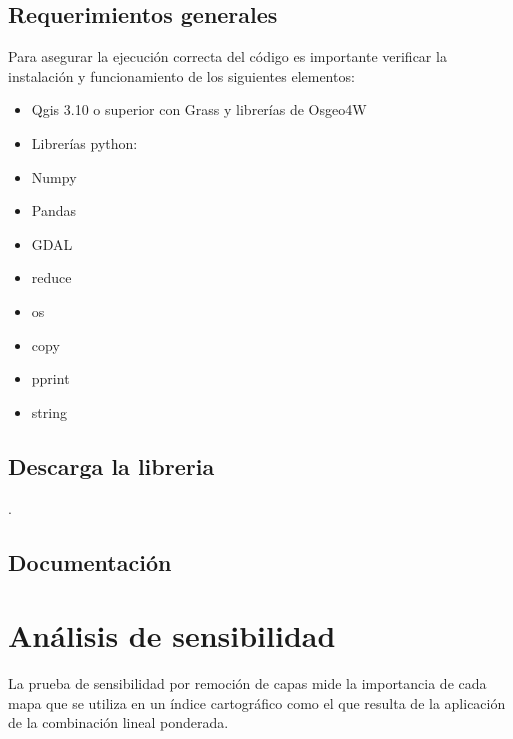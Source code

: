 \documentclass[letterpaper,10pt,spanish]{sphinxmanual}
\begin{document}
\subsection{Requerimientos generales}
\label{\detokenize{apcsig:requerimientos-generales}}
Para asegurar la ejecución correcta del código es importante
verificar la instalación y funcionamiento de los siguientes elementos:
\begin{itemize}
\item {} 
Qgis 3.10 o superior con Grass y librerías de Osgeo4W

\item {} 
Librerías python:

\end{itemize}
\begin{itemize}
\item {} 
Numpy

\item {} 
Pandas

\item {} 
GDAL

\item {} 
reduce

\item {} 
os

\item {} 
copy

\item {} 
pprint

\item {} 
string

\end{itemize}


\subsection{Descarga la libreria}
\label{\detokenize{apcsig:descarga-la-libreria}}
.


\subsection{Documentación}
\label{\detokenize{apcsig:documentacion}}

\section{Análisis de sensibilidad}
\label{\detokenize{analisis:analisis-de-sensibilidad}}\label{\detokenize{analisis::doc}}
La prueba de sensibilidad por remoción de capas mide la importancia de cada mapa que se utiliza en un índice cartográfico como el que resulta de la aplicación de la combinación lineal ponderada.
\end{document}
